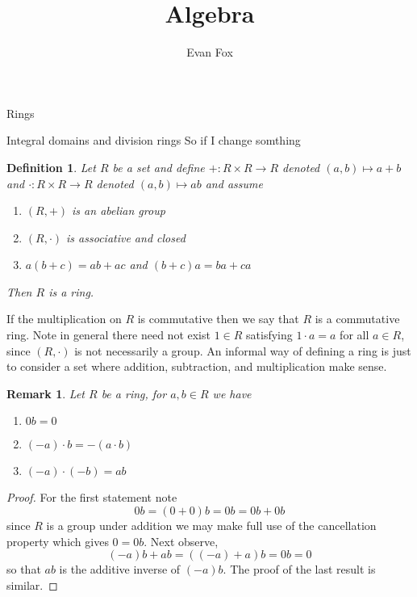 \documentclass[11pt]{report}
\author{Evan Fox}
\title{Algebra}
\theoremstyle{break}
\newtheorem{defn}[thm]{Definition}
\newtheorem{rem}[thm]{Remark}
\begin{document}
\maketitle
\begin{chapter}{Rings}

\begin{section}{Integral domains and division rings}
    So if I change somthing
    
    \begin{defn}
        Let $R$ be a set and define $+:R \times R \to R$ denoted $(a, b) \mapsto a + b$ and $\cdot: R \times R \to R$ denoted $(a, b) \mapsto ab$
        and assume 
        
        \begin{enumerate}
            \item $(R, +)$ is an abelian group 
            \item $(R, \cdot)$ is associative and closed 
            \item $a(b + c) = ab + ac$ and $(b + c)a = ba + ca$
        \end{enumerate}

        Then $R$ is a ring. 
    \end{defn}
If the multiplication on $R$ is commutative then we say that $R$ is a commutative ring. Note in general there need not exist $1 \in R$ satisfying $1 \cdot a = a$ for all $a \in R$, 
since $(R, \cdot)$ is not necessarily a group. An informal way of defining a ring is just to consider a set where addition, subtraction, and multiplication make sense. 

    
    \begin{rem}
        Let $R$ be a ring, for $a, b \in R$ we have 
        
        \begin{enumerate}
            \item $0b = 0$ 
            \item $(-a) \cdot b = -(a \cdot b)$
            \item $(-a) \cdot (-b) = ab $
        \end{enumerate}
    \end{rem}
    
    
    \begin{proof}
        For the first statement note 
        \[0b = (0 + 0)b = 0b = 0b + 0b\]
        since $R$ is a group under addition we may make full use of the cancellation property which gives $0 = 0b$. 
        Next observe, 
        \[(-a)b + ab = ((-a) + a)b = 0b = 0 \]
        so that $ab$ is the additive inverse of $(-a)b$. The proof of the last result is similar. 


\end{proof}
\end{section}
\end{chapter}
\end{document}
